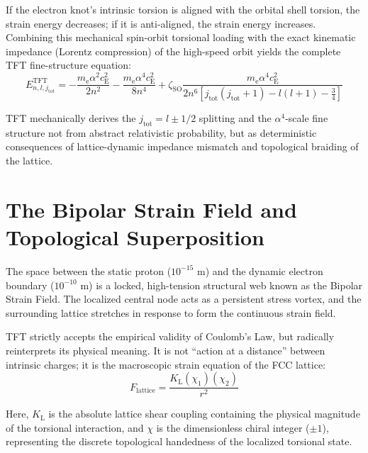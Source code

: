If the electron knot's intrinsic torsion is aligned with the orbital shell torsion, the strain energy decreases; if it is anti-aligned, the strain energy increases. Combining this mechanical spin-orbit torsional loading with the exact kinematic impedance (Lorentz compression) of the high-speed orbit yields the complete TFT fine-structure equation:
\begin{equation}
    E_{n,l,j_{\mathrm{tot}}}^{\mathrm{TFT}} = -\frac{m_{\mathrm{e}} \alpha^2 c_{\mathrm{E}}^2}{2n^2} - \frac{m_{\mathrm{e}} \alpha^4 c_{\mathrm{E}}^2}{8n^4} + \zeta_{\mathrm{SO}} \frac{m_{\mathrm{e}} \alpha^4 c_{\mathrm{E}}^2}{2n^6 \left[j_{\mathrm{tot}}(j_{\mathrm{tot}}+1) - l(l+1) - \frac{3}{4}\right]}
\end{equation}

TFT mechanically derives the $j_{\mathrm{tot}} = l \pm 1/2$ splitting and the $\alpha^4$-scale fine structure not from abstract relativistic probability, but as deterministic consequences of lattice-dynamic impedance mismatch and topological braiding of the lattice.

\section{The Bipolar Strain Field and Topological Superposition}
The space between the static proton ($10^{-15}$ m) and the dynamic electron boundary ($10^{-10}$ m) is a locked, high-tension structural web known as the Bipolar Strain Field. The localized central node acts as a persistent stress vortex, and the surrounding lattice stretches in response to form the continuous strain field.

TFT strictly accepts the empirical validity of Coulomb's Law, but radically reinterprets its physical meaning. It is not ``action at a distance'' between intrinsic charges; it is the macroscopic strain equation of the FCC lattice:
\begin{equation}
    F_{\mathrm{lattice}} = \frac{K_{\mathrm{L}} (\chi_1)(\chi_2)}{r^2}
\end{equation}

Here, $K_{\mathrm{L}}$ is the absolute lattice shear coupling containing the physical magnitude of the torsional interaction, and $\chi$ is the dimensionless chiral integer ($\pm 1$), representing the discrete topological handedness of the localized torsional state.

